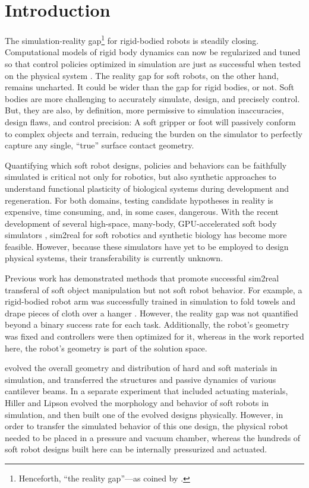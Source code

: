 \section{Introduction}
\label{sec:intro}

The simulation-reality gap\footnote{Henceforth, ``the reality gap''---as coined by \citet{jakobi1995noise}.} for rigid-bodied robots is steadily closing.
Computational models of rigid body dynamics can now be regularized and tuned so that control policies optimized in simulation are just as successful when tested on the physical system \cite{bongard2006resilient,hwangbo2019learning}.
The reality gap for soft robots, on the other hand, remains uncharted.
It could be wider than the gap for rigid bodies, or not.
Soft bodies are more challenging to accurately simulate, design, and precisely control.
But, they are also, by definition, more permissive to simulation inaccuracies, design flaws, and control precision: 	
A soft gripper or foot will passively conform to complex objects and terrain, reducing the burden on the simulator to perfectly capture any single, ``true'' surface contact geometry.

Quantifying which soft robot designs, policies and behaviors can be faithfully simulated is critical not only for robotics, but also synthetic approaches to understand functional plasticity of biological systems during development and regeneration.
For both domains, testing candidate hypotheses in reality is expensive, time consuming, and, in some cases, dangerous.
With the recent development of several high-space, many-body, GPU-accelerated 
soft body simulators \cite{holden2019subspace,macklin2019non},
sim2real for soft robotics and synthetic biology has become more feasible.
However, because these simulators have yet to be employed to design physical systems, their transferability is currently unknown.

Previous work has demonstrated methods that promote successful sim2real transferal of soft object manipulation but not soft robot behavior.
For example, a rigid-bodied robot arm was successfully trained in simulation to fold towels and drape pieces of cloth over a hanger \cite{matas2018sim}.
However, the reality gap was not quantified beyond a binary success rate for each task.
Additionally, the robot's geometry was fixed and controllers were then optimized for it, whereas in the work reported here, the robot's geometry is part of the solution space.

\citet{hiller2011automatic} evolved the overall geometry and distribution of hard and soft materials in simulation, and transferred the structures and passive dynamics of various cantilever beams.
In a separate experiment that included actuating materials, Hiller and Lipson evolved the morphology and behavior of soft robots in simulation, and then built one of the evolved designs physically. 
However, in order to transfer the simulated behavior of this one design, the physical robot needed to be placed in a pressure and vacuum chamber,
whereas the hundreds of soft robot designs built here can be internally pressurized and actuated.

